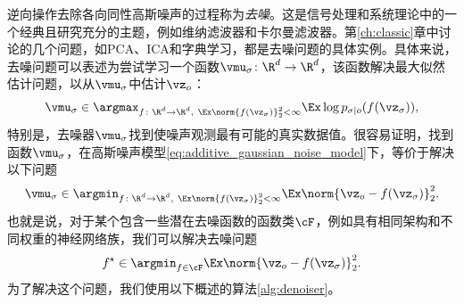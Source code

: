 \documentclass[../../book-main.tex]{subfiles}
\begin{document}
逆向操作去除各向同性高斯噪声的过程称为\textit{去噪}。这是信号处理和系统理论中的一个经典且研究充分的主题，例如维纳滤波器和卡尔曼滤波器。第\ref{ch:classic}章中讨论的几个问题，如PCA、ICA和字典学习，都是去噪问题的具体实例。具体来说，去噪问题可以表述为尝试学习一个函数\(\vmu_{\sigma} \colon \R^{d} \to \R^{d}\)，该函数解决最大似然估计问题，以从\(\vmu_{\sigma}\)中估计\(\vz_{o}\)：
\begin{equation}\label{eq:denoiser_maximum_likelihood}
    \vmu_{\sigma} \in \argmax_{\substack{f \colon \R^{d} \to \R^{d},\   
    \Ex\norm{f(\vz_{\sigma})}_{2}^{2} < \infty}}\Ex \log p_{\sigma \mid o}(f(\vz_{\sigma})),
\end{equation}
特别是，去噪器\(\vmu_{\sigma}\)找到使噪声观测最有可能的真实数据值。很容易证明，找到函数\(\vmu_{\sigma}\)，在高斯噪声模型\eqref{eq:additive_gaussian_noise_model}下，等价于解决以下问题
\begin{equation}\label{eq:denoiser_conditional_expectation}
    \vmu_{\sigma} \in \argmin_{\substack{f \colon \R^{d} \to \R^{d},\ %
    \Ex\norm{f(\vz_{\sigma})}_{2}^{2} < \infty}}\Ex\norm{\vz_{o} - f(\vz_{\sigma})}_{2}^{2}.
\end{equation}
也就是说，对于某个包含一些潜在去噪函数的函数类\(\cF\)，例如具有相同架构和不同权重的神经网络族，我们可以解决去噪问题
\begin{equation}\label{eq:denoiser_learning_problem}
    f^{\star} \in \argmin_{f \in \cF}\Ex\norm{\vz_{o} - f(\vz_{\sigma})}_{2}^{2}.
\end{equation}
为了解决这个问题，我们使用以下概述的算法\ref{alg:denoiser}。
\end{document}
